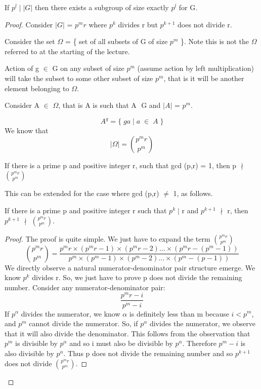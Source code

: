 \begin{theorem}
If $p^{l} \; | \; |G|$ then there exists a subgroup of size exactly $p^{l}$ for G.
\end{theorem}

\begin{proof}

Consider $|G|$ = $p^{m}r$ where $p^{k}$ divides r but $p^{k+1}$ does not divide r.

Consider the set $\Omega$ = \{ set of all subsets of G of size $p^{m}$ \}. Note this is not the $\Omega$ referred to at the starting of the lecture.

Action of g $\in$ G on any subset of size $p^{m}$ (assume action by left multiplication) will take the subset to some other subset of size $p^{m}$, that is it will be another element belonging to $\Omega$.

Consider A $\in$ $\Omega$, that is A is such that A $ $ G and $|A|$ = $p^{m}$.

$$ A^{g} = \{\; ga\; | \; a\; \in \; A \;\} $$
We know that
$$ |\Omega| = {p^{m}r \choose p^{m}} $$

\begin{theorem}
If there is a prime p and positive integer r, such that gcd (p,r) = 1, then p $\nmid$ ${p^{m}r \choose p^{m}}$
\end{theorem}

This can be extended for the case where gcd (p,r) $\neq$ 1, as follows.
\begin{theorem}
If there is a prime p and positive integer r such that $p^{k} \;|$ r and $p^{k+1}$ $\nmid$ r, then $p^{k+1}$ $\nmid$ $p^{m}r \choose p^{m}$. 
\end{theorem}
\begin{proof}
The proof is quite simple. We just have to expand the term $p^{m}r \choose p^{m}$
\[  {p^{m}r \choose p^{m}} = \frac{p^{m}r \times (p^{m}r - 1) \times (p^{m}r - 2) \ldots \times (p^{m}r - (p^{m} - 1))}{p^{m} \times (p^{m} - 1) \times (p^{m} - 2) \ldots \times (p^{m} - (p - 1))} \]
We directly observe a natural numerator-denominator pair structure emerge. We know $p^{k}$ divides r. So, we just have to prove p does not divide the remaining number. Consider any numerator-denominator pair:
$$ \frac{p^{m}r - i}{p^{m} - i} $$
If $p^{\alpha}$ divides the numerator, we know $\alpha$ is definitely less than m because $i < p^{m}$, and $p^{m}$ cannot divide the numerator. So, if $p^{\alpha}$ divides the numerator, we observe that it will also divide the denominator. This follows from the observation that $p^{m}$ is divisible by $p^{\alpha}$ and so i must also be divisible by $p^{\alpha}$. Therefore $p^{m} - i$ is also divisible by $p^{\alpha}$. Thus p does not divide the remaining number and so $p^{k+1}$ does not divide $p^{m}r \choose p^{m}$. 
\end{proof}


\end{proof}
